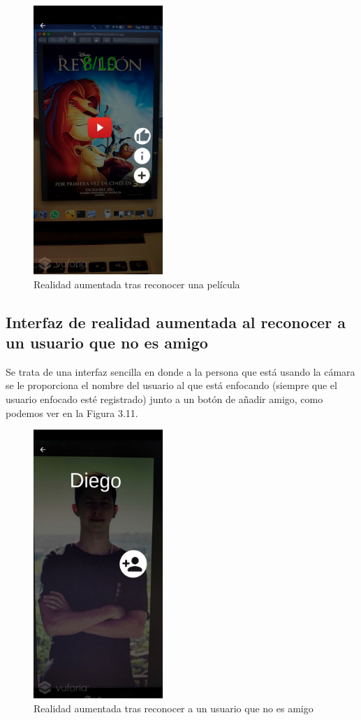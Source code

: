 \begin{figure}[H]
    \centering
    \includegraphics[height=4in]{figures/filmrecognized2.jpg}
    \caption{Realidad aumentada tras reconocer una película}
\end{figure}

\subsection{Interfaz de realidad aumentada al reconocer a un usuario que no es amigo}
\label{makereference3.4.5.1}
\begin{flushleft}
Se trata de una interfaz sencilla en donde a la persona que está usando la cámara se le proporciona el nombre del usuario al
 que está enfocando (siempre que el usuario enfocado esté registrado) junto a un botón de añadir amigo, como podemos ver en la Figura 3.11.
\end{flushleft}
\begin{figure}[H]
    \centering
    \includegraphics[height=4in]{figures/usernotFriendrecognized.jpg}
    \caption{Realidad aumentada tras reconocer a un usuario que no es amigo}
\end{figure}
